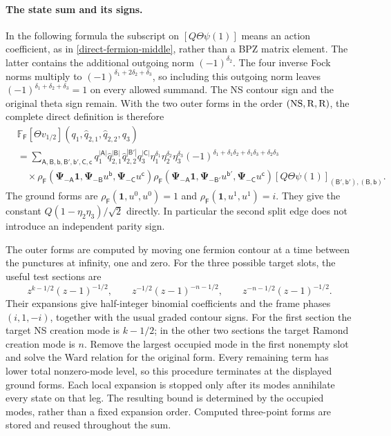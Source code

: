 \paragraph{The state sum and its signs.}
In the following formula the subscript on
$[Q\Theta\psi(1)]$ means an action coefficient, as in
\eqref{direct-fermion-middle}, rather than a BPZ matrix element.
The latter contains the additional outgoing norm
$(-1)^{\delta_2}$.  The four inverse Fock norms multiply to
$(-1)^{\delta_1+2\delta_2+\delta_3}$, so including this outgoing
norm leaves $(-1)^{\delta_1+\delta_2+\delta_3}=1$ on every allowed
summand.  The NS contour sign and the original theta sign remain.
With the two outer forms in the order $(\mathrm{NS},\mathrm{R},\mathrm{R})$, the complete
direct definition is therefore
\begin{align}
 &\mathbb F_{\mathsf F}[\Theta v_{1/2}]
 (q_1,\hat q_{2,1},\hat q_{2,2},q_3)\nonumber\\
 &=\sum_{\mathsf A,\mathsf B,\mathsf b,
                \mathsf B',\mathsf b',\mathsf C,\mathsf c}
 q_1^{|\mathsf A|}\hat q_{2,1}^{|\mathsf B|}
 \hat q_{2,2}^{|\mathsf B'|}q_3^{|\mathsf C|}
 \eta_1^{\delta_1}\eta_2^{\delta_2}\eta_3^{\delta_3}
 (-1)^{\delta_1+\delta_1\delta_2+\delta_1\delta_3+\delta_2\delta_3}
 \nonumber\\
 &\quad\times
 \rho_{\mathsf F}\!\left(
  \boldsymbol\Psi_{-\mathsf A}\mathbf1,
  \boldsymbol\Psi_{-\mathsf B}u^{\mathsf b},
  \boldsymbol\Psi_{-\mathsf C}u^{\mathsf c}\right)
 \rho_{\mathsf F}\!\left(
  \boldsymbol\Psi_{-\mathsf A}\mathbf1,
  \boldsymbol\Psi_{-\mathsf B'}u^{\mathsf b'},
  \boldsymbol\Psi_{-\mathsf C}u^{\mathsf c}\right)
 [Q\Theta\psi(1)]_{(\mathsf B',\mathsf b'),(\mathsf B,\mathsf b)}.
 \label{direct-fermion-sum}
\end{align}
The ground forms are
$\rho_{\mathsf F}(\mathbf1,u^0,u^0)=1$ and
$\rho_{\mathsf F}(\mathbf1,u^1,u^1)=i$.  They give the constant
$Q(1-\eta_2\eta_3)/\sqrt2$ directly.  In particular the second
split edge does not introduce an independent parity sign.

The outer forms are computed by moving one fermion contour at a time
between the punctures at infinity, one and zero.  For the three possible
target slots, the useful test sections are
\begin{equation}
 z^{k-1/2}(z-1)^{-1/2},\qquad
 z^{-1/2}(z-1)^{-n-1/2},\qquad
 z^{-n-1/2}(z-1)^{-1/2}.
\end{equation}
Their expansions give half-integer binomial coefficients and the
frame phases $(i,1,-i)$, together with the usual graded contour signs.
For the first section the target NS creation mode is $k-1/2$; in the
other two sections the target Ramond creation mode is $n$.  Remove
the largest occupied mode in the first nonempty slot and solve the
Ward relation for the original form.  Every remaining term has lower
total nonzero-mode level, so this procedure terminates at the displayed
ground forms.  Each local expansion is stopped only after its modes
annihilate every state on that leg.  The resulting bound is determined
by the occupied modes, rather than a fixed expansion order.
Computed three-point forms are stored and reused throughout the sum.

